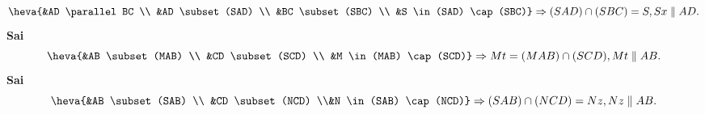 \begin{ex}
{\begin{itemchoice}
\[			\heva{&AD \parallel BC \\ &AD \subset (SAD) \\ &BC \subset (SBC) \\  &S \in (SAD) \cap (SBC)}
			\Rightarrow (SAD)  \cap (SBC)=S, Sx \parallel AD.
			\] 
			 \itemch \textbf{Sai}\\
			 \[
			\heva{&AB \subset (MAB) \\ &CD \subset (SCD) \\ &M \in  (MAB) \cap (SCD)}
			\Rightarrow Mt = (MAB) \cap (SCD),  Mt \parallel AB.
			 \]
			 \itemch \textbf{Sai} \\
			\[ 
			\heva{&AB \subset (SAB) \\ &CD \subset (NCD) \\&N \in (SAB)  \cap (NCD)}
			\Rightarrow (SAB) \cap (NCD)=Nz, Nz \parallel AB. 
			\] 
		\end{itemchoice}
	 }
\end{ex}

